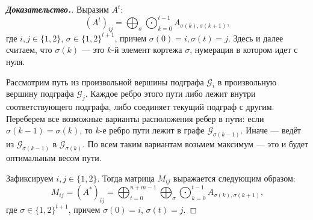\documentclass[12pt]{article}
\begin{document}
\begin{proof}[\textbf{Доказательство.}]
Выразим $A^t$: 
\begin{equation*}
(A^t)_{ij} = \bigoplus_{\sigma}\bigodot_{k = 0}^{t - 1} A_{\sigma(k), \sigma(k + 1)},
\end{equation*}
где $i, j \in \{1, 2\}$, $\sigma \in \{1, 2\}^{t + 1}$, причем $\sigma(0) = i, \sigma(t) = j$. Здесь и далее считаем, что $\sigma(k)$ --- это $k$-й элемент кортежа $\sigma$, нумерация в котором идет с нуля.

Рассмотрим путь из произвольной вершины подграфа $\mathcal{G}_i$ в произвольную вершину подграфа $\mathcal{G}_j$. Каждое ребро этого пути либо лежит внутри соответствующего подграфа, либо соединяет текущий подграф с другим. Переберем все возможные варианты расположения ребер в пути: если $\sigma(k-1) = \sigma(k)$, то $k$-е ребро пути лежит в графе $\mathcal{G}_{\sigma(k-1)}$. Иначе --- ведёт из $\mathcal{G}_{\sigma(k-1)}$ в $\mathcal{G}_{\sigma(k)}$. По всем таким вариантам возьмем максимум --- это и будет оптимальным весом пути.

Зафиксируем $i, j \in \{1, 2\}$. Тогда матрица $M_{ij}$ выражается следующим образом:
\begin{equation*}
M_{ij} = (A^*)_{ij} = \bigoplus_{t = 0}^{n + m - 1}\bigoplus_{\sigma}\bigodot_{k = 0}^{t - 1} A_{\sigma(k), \sigma(k + 1)},
\end{equation*}
где $\sigma \in \{1, 2\}^{t + 1}$, причем $\sigma(0) = i$, $\sigma(t) = j$.
\end{proof}
\end{document}
